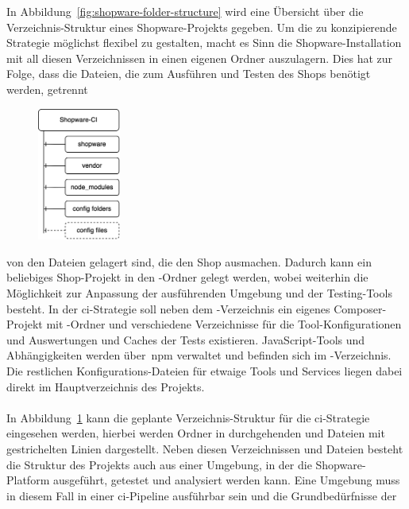 In Abbildung\ \ref{fig:shopware-folder-structure} wird eine Übersicht über die Verzeichnis-Struktur eines
Shopware-Projekts gegeben.
Um die zu konzipierende Strategie möglichst flexibel zu gestalten, macht es Sinn die Shopware-Installation mit all
diesen Verzeichnissen in einen eigenen Ordner auszulagern.
Dies hat zur Folge, dass die Dateien, die zum Ausführen und Testen des Shops benötigt werden, getrennt
\begin{figure}
    \centering
    \includegraphics[width=0.244\textwidth]{images/content/shopware-ci-folder-structure}
    \label{fig:shopware-ci-folder-structure}
\end{figure}
von den Dateien gelagert sind, die den Shop ausmachen.
Dadurch kann ein beliebiges Shop-Projekt in den -Ordner gelegt werden, wobei weiterhin die
Möglichkeit zur Anpassung der ausführenden Umgebung und der Testing-Tools besteht.
In der \acrshort{ci}-Strategie soll neben dem -Verzeichnis ein eigenes Composer-Projekt mit
-Ordner und verschiedene Verzeichnisse für die Tool-Konfigurationen und Auswertungen und Caches
der Tests existieren.
JavaScript-Tools und Abhängigkeiten werden über\ \acrshort{npm} verwaltet und befinden sich im
-Verzeichnis.
Die restlichen Konfigurations-Dateien für etwaige Tools und Services liegen dabei direkt im Hauptverzeichnis des
\mbox{Projekts}.
\\\\
In Abbildung\ \ref{fig:shopware-ci-folder-structure} kann die geplante Verzeichnis-Struktur für die
\acrshort{ci}-Strategie eingesehen werden, hierbei werden Ordner in durchgehenden und Dateien mit gestrichelten Linien
dargestellt.
Neben diesen Verzeichnissen und Dateien besteht die Struktur des Projekts auch aus einer Umgebung, in der die
Shopware-Platform ausgeführt, getestet und analysiert werden kann.
Eine Umgebung muss in diesem Fall in einer \acrshort{ci}-Pipeline ausführbar sein und die Grundbedürfnisse der
